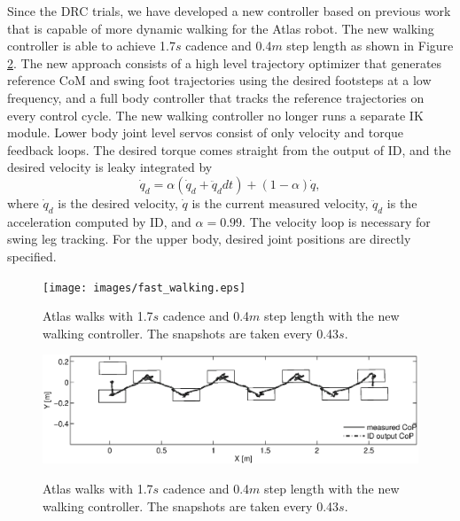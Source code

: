 \documentclass{ws-ijhr}
\newcommand{\fref}[1] {Figure \ref{#1}}
\begin{document}
Since the DRC trials, we have developed a new controller based on previous 
work \cite{sfeng_online,sfeng_proposal} that is capable of more dynamic walking
for the Atlas robot. 
The new walking controller is able to achieve 1.7$s$ cadence and 0.4$m$
step length as shown in \fref{fig:fast_walking}. 
The new approach consists of a high level trajectory optimizer that generates
reference CoM and swing foot trajectories using the desired footsteps at a low
frequency, and a full body controller that tracks the reference trajectories 
on every control cycle. 
The new walking controller no longer runs a separate IK module. 
Lower body joint level servos consist of only velocity and torque feedback 
loops. 
The desired torque comes straight from the output of ID, and the desired 
velocity is leaky integrated by
\begin{equation}
  \dot{q}_d = \alpha (\dot{q}_d + \ddot{q}_d dt) + (1-\alpha) \dot{q},
	\label{eq:qd_int}
\end{equation} 
where $\dot{q}_d$ is the desired velocity, $\dot{q}$ is the current 
measured velocity, $\ddot{q}_d$ is the acceleration computed by ID, and $\alpha = 0.99$. 
The velocity loop is necessary for swing leg tracking. 
For the upper body, desired joint positions are directly specified.

\begin{figure} 
  \begin{center}
    {\texttt{[image: images/fast\_walking.eps]}}
    \caption{Atlas walks with 1.7$s$ cadence and 0.4$m$ step length with the
		new walking controller. The snapshots are taken every 0.43$s$.} 
		\label{fig:fast_walking}
  \end{center}
\end{figure}   

\begin{figure} 
  \begin{center}
    {\includegraphics[width=1\textwidth]{images/new_cop.eps}}
    \caption{Atlas walks with 1.7$s$ cadence and 0.4$m$ step length with the
		new walking controller. The snapshots are taken every 0.43$s$.} 
		\label{fig:fast_walking}
  \end{center}
\end{figure}   
 
\end{document}
